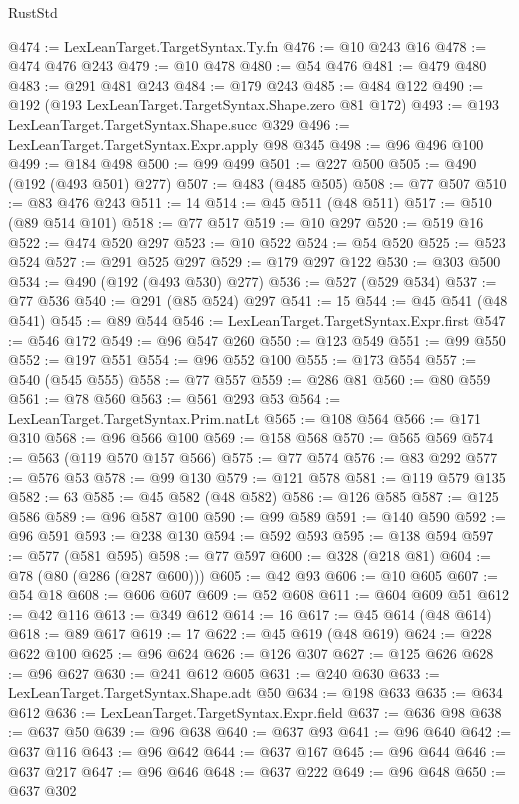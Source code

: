 \begin{lexlean}{RustStd}
\begin{coremodule}
@474 := LexLeanTarget.TargetSyntax.Ty.fn
@476 := @10 @243 @16
@478 := @474 @476 @243
@479 := @10 @478
@480 := @54 @476
@481 := @479 @480
@483 := @291 @481 @243
@484 := @179 @243
@485 := @484 @122
@490 := @192 (@193 LexLeanTarget.TargetSyntax.Shape.zero @81 @172)
@493 := @193 LexLeanTarget.TargetSyntax.Shape.succ @329
@496 := LexLeanTarget.TargetSyntax.Expr.apply @98 @345
@498 := @96 @496 @100
@499 := @184 @498
@500 := @99 @499
@501 := @227 @500
@505 := @490 (@192 (@493 @501) @277)
@507 := @483 (@485 @505)
@508 := @77 @507
@510 := @83 @476 @243
@511 := 14
@514 := @45 @511 (@48 @511)
@517 := @510 (@89 @514 @101)
@518 := @77 @517
@519 := @10 @297
@520 := @519 @16
@522 := @474 @520 @297
@523 := @10 @522
@524 := @54 @520
@525 := @523 @524
@527 := @291 @525 @297
@529 := @179 @297 @122
@530 := @303 @500
@534 := @490 (@192 (@493 @530) @277)
@536 := @527 (@529 @534)
@537 := @77 @536
@540 := @291 (@85 @524) @297
@541 := 15
@544 := @45 @541 (@48 @541)
@545 := @89 @544
@546 := LexLeanTarget.TargetSyntax.Expr.first
@547 := @546 @172
@549 := @96 @547 @260
@550 := @123 @549
@551 := @99 @550
@552 := @197 @551
@554 := @96 @552 @100
@555 := @173 @554
@557 := @540 (@545 @555)
@558 := @77 @557
@559 := @286 @81
@560 := @80 @559
@561 := @78 @560
@563 := @561 @293 @53
@564 := LexLeanTarget.TargetSyntax.Prim.natLt
@565 := @108 @564
@566 := @171 @310
@568 := @96 @566 @100
@569 := @158 @568
@570 := @565 @569
@574 := @563 (@119 @570 @157 @566)
@575 := @77 @574
@576 := @83 @292
@577 := @576 @53
@578 := @99 @130
@579 := @121 @578
@581 := @119 @579 @135
@582 := 63
@585 := @45 @582 (@48 @582)
@586 := @126 @585
@587 := @125 @586
@589 := @96 @587 @100
@590 := @99 @589
@591 := @140 @590
@592 := @96 @591
@593 := @238 @130
@594 := @592 @593
@595 := @138 @594
@597 := @577 (@581 @595)
@598 := @77 @597
@600 := @328 (@218 @81)
@604 := @78 (@80 (@286 (@287 @600)))
@605 := @42 @93
@606 := @10 @605
@607 := @54 @18
@608 := @606 @607
@609 := @52 @608
@611 := @604 @609 @51
@612 := @42 @116
@613 := @349 @612
@614 := 16
@617 := @45 @614 (@48 @614)
@618 := @89 @617
@619 := 17
@622 := @45 @619 (@48 @619)
@624 := @228 @622 @100
@625 := @96 @624
@626 := @126 @307
@627 := @125 @626
@628 := @96 @627
@630 := @241 @612 @605
@631 := @240 @630
@633 := LexLeanTarget.TargetSyntax.Shape.adt @50
@634 := @198 @633
@635 := @634 @612
@636 := LexLeanTarget.TargetSyntax.Expr.field
@637 := @636 @98
@638 := @637 @50
@639 := @96 @638
@640 := @637 @93
@641 := @96 @640
@642 := @637 @116
@643 := @96 @642
@644 := @637 @167
@645 := @96 @644
@646 := @637 @217
@647 := @96 @646
@648 := @637 @222
@649 := @96 @648
@650 := @637 @302

\end{coremodule}
\end{lexlean}
